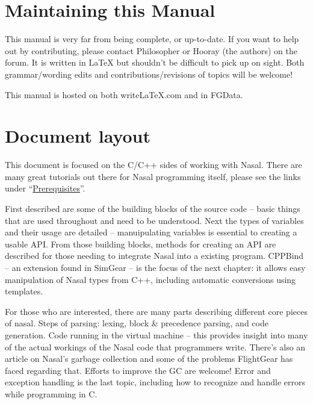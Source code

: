 \documentclass{article}
\newcommand{\todo}[1]{}
\newcommand{\comment}[1]{}%
\begin{document}
\section{Maintaining this Manual}
\todo{mention useful tools such as cscope, doxygen, Source Navigator NG}
This manual is very far from being complete, or up-to-date.  If you want to help out by contributing, please contact Philosopher or Hooray (the authors) on the forum.  It is written in LaTeX but shouldn't be difficult to pick up on sight.  Both grammar/wording edits and contributions/revisions of topics will be welcome!

This manual is hosted on both writeLaTeX.com and in FGData.

\section{Document layout}
\comment{
Creating API:
	Globals and Contexts
	Variables
	How to Create an API
	Using CPPBind
Internals:
	Parsing
		Lexing
		Block Parsing
		Precedence Parsing
		Generating Bytecode
	Virtual Machine
	Garbage Collection
	Error and Exception Handling
Examples and Existing Work:
	Nasal Maintenance
	Introspection
	Example APIs
		Perl-Compatable-Regular-Expressions (PCRE)
		SQLite
		Cairo/GNU ToolKit (GTK)
		FlightGear Canvas
		FlightGear Positioned
}
This document is focused on the C/C++ sides of working with Nasal.  There are many great tutorials out there for Nasal programming itself, please see the links under ``\hyperlink{section:Prerequisites}{Prerequisites}''.

First described are some of the building blocks of the source code -- basic things that are used throughout and need to be understood.  Next the types of variables and their usage are detailed -- manuipulating variables is essential to creating a usable API.  From those building blocks, methods for creating an API are described for those needing to integrate Nasal into a existing program.  CPPBind -- an extension found in SimGear -- is the focus of the next chapter: it allows easy manipulation of Nasal types from C++, including automatic conversions using templates.

For those who are interested, there are many parts describing different core pieces of nasal.  Steps of parsing: lexing, block \& precedence parsing, and code generation.  Code running in the virtual machine -- this provides insight into many of the actual workings of the Nasal code that programmers write.  There's also an article on Nasal's garbage collection and some of the problems FlightGear has faced regarding that.  Efforts to improve the GC are welcome!  Error and exception handling is the last topic, including how to recognize and handle errors while programming in C.
\end{document}
